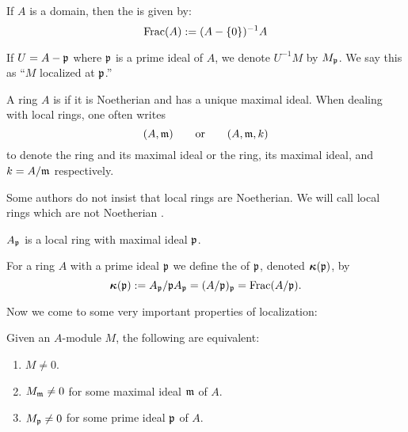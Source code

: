 \documentclass{ximera}
\begin{document}
\begin{definition} If $A$ is a domain, then the  is given by:
\[
\operatorname{Frac}(A) :=(A-\{0\})^{-1}A
\]
\end{definition}


\begin{definition} If $U = A-\mathfrak{p}$ where $\mathfrak{p}$ is a prime ideal of $A$, we denote $U^{-1}M$ by $M_\mathfrak p$. We say this as ``$M$ localized at $\mathfrak p$.''
\end{definition}


\begin{definition} A ring $A$ is  if it is Noetherian and has a unique maximal ideal. When dealing with local rings, one often writes
\[
(A,\mathfrak{m}) \qquad \text{or}\qquad (A,\mathfrak{m},k)
\]
to denote the ring and its maximal ideal or the ring, its maximal ideal, and $k = A/\mathfrak{m}$ respectively.
\end{definition}

\begin{remark} Some authors do not insist that local rings are Noetherian. We will call local rings which are not Noetherian .
\end{remark}


\begin{proposition} $A_\mathfrak p$ is a local ring with maximal ideal $\mathfrak p$. 
\end{proposition}


\begin{definition} For a ring $A$ with a prime ideal $\mathfrak{p}$ we define the  of $\mathfrak{p}$, denoted $\boldsymbol{\kappa}(\mathfrak{p})$, by
\[
\boldsymbol{\kappa}(\mathfrak{p}) := A_\mathfrak{p}/\mathfrak{p}A_\mathfrak{p}= (A/\mathfrak{p})_\mathfrak{p} = \operatorname{Frac}(A/\mathfrak{p}).
\] 
\end{definition}

Now we come to some very important properties of localization:

\begin{proposition} Given an $A$-module $M$, the following are equivalent:
\begin{enumerate}
\item $M \ne 0$.
\item $M_{\mathfrak{m}} \ne 0$ for some maximal ideal $\mathfrak{m}$ of $A$.
\item $M_{\mathfrak{p}} \ne 0$ for some prime ideal $\mathfrak{p}$ of $A$.
\end{enumerate}
\end{proposition}
\end{document}
